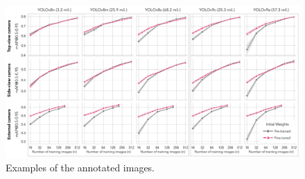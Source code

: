 \begin{figure}[H]
    \centering
    \includegraphics[width=1\textwidth]{figure_5.jpg}
    \caption{Examples of the annotated images.}
    \label{fig:finetune}
\end{figure}

